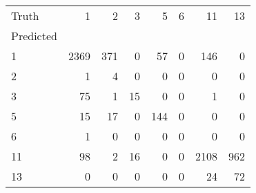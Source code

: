 \begin{tabular}{lrrrrrrr}
\toprule
Truth & 1 & 2 & 3 & 5 & 6 & 11 & 13 \\
Predicted &  &  &  &  &  &  &  \\
\midrule
1 & 2369 & 371 & 0 & 57 & 0 & 146 & 0 \\
2 & 1 & 4 & 0 & 0 & 0 & 0 & 0 \\
3 & 75 & 1 & 15 & 0 & 0 & 1 & 0 \\
5 & 15 & 17 & 0 & 144 & 0 & 0 & 0 \\
6 & 1 & 0 & 0 & 0 & 0 & 0 & 0 \\
11 & 98 & 2 & 16 & 0 & 0 & 2108 & 962 \\
13 & 0 & 0 & 0 & 0 & 0 & 24 & 72 \\
\bottomrule
\end{tabular}
